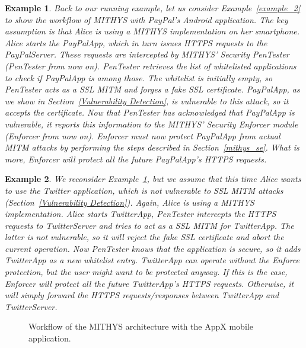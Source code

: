 \documentclass[english]{llncs}
\newtheorem{myexample}{Example}
\begin{document}
\begin{myexample}
\label{example_3}
Back to our running example, let us consider Example~\ref{example_2} to show the workflow of MITHYS with PayPal's Android application. The key assumption is that Alice is using a MITHYS implementation on her smartphone. Alice starts the PayPalApp, which in turn issues HTTPS requests to the PayPalServer. These requests are intercepted by MITHYS' Security PenTester (PenTester from now on). PenTester retrieves the list of whitelisted applications to check if PayPalApp is among those. The whitelist is initially empty, so PenTester acts as a SSL MITM and forges a fake SSL certificate. PayPalApp, as we show in Section~\ref{Vulnerability Detection}, is vulnerable to this attack, so it accepts the certificate. Now that PenTester has acknowledged that PayPalApp is vulnerable, it reports this information to the MITHYS' Security Enforcer module (Enforcer from now on). Enforcer must now protect PayPalApp from actual MITM attacks by performing the steps described in Section~\ref{mithys_se}. What is more, Enforcer will protect all the future PayPalApp's HTTPS requests. 
\end{myexample}

\begin{myexample}
\label{example_4}
We reconsider Example~\ref{example_3}, but we assume that this time Alice wants to use the Twitter application, which is not vulnerable to SSL MITM attacks (Section~\ref{Vulnerability Detection}). Again, Alice is using a MITHYS implementation. Alice starts TwitterApp, PenTester intercepts the HTTPS requests to TwitterServer and tries to act as a SSL MITM for TwitterApp. The latter is not vulnerable, so it will reject the fake SSL certificate and abort the current operation. Now PenTester knows that the application is secure, so it adds TwitterApp as a new whitelist entry. TwitterApp can operate without the Enforce protection, but the user might want to be protected anyway. If this is the case, Enforcer will protect all the future TwitterApp's HTTPS requests. Otherwise, it will simply forward the HTTPS requests/responses between TwitterApp and TwitterServer.
\end{myexample}

\begin{figure}[h!]
	\centering
	\caption{Workflow of the MITHYS architecture with the AppX mobile application.}
	\label{fig:mithys_architecture_appx_workflow}
\end{figure}
\end{document}
